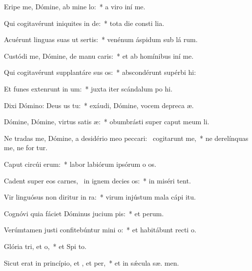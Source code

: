\item Eripe me, Dómine, ab mine lo:~* a viro iní  me.
\item Qui cogitavérunt iniquites in de:~* tota die consti lia.
\item Acuérunt linguas suas ut sertis:~* venénum áspidum sub lá rum.
\item Custódi me, Dómine, de manu caris:~* et ab homínibus iní  me.
\item Qui cogitavérunt supplantáre sus os:~* abscondérunt supérbi  hi:
\item Et funes extenrunt in um:~* juxta iter scándalum po hi.
\item Dixi Dómino: Deus us  tu:~* exáudi, Dómine, vocem depreca æ.
\item Dómine, Dómine, virtus satis æ:~* obumbrásti super caput meum   li.
\item Ne tradas me, Dómine, a desidério meo peccari:~\pscross{} cogitarunt  me,~* ne derelínquas me, ne for tur.
\item Caput circúi erum:~* labor labiórum ipsórum o os.
\item Cadent super eos carnes,~\pscross{} in ignem decies os:~* in miséri  tent.
\item Vir linguósus non diritur in ra:~* virum injústum mala cápi  itu.
\item Cognóvi quia fáciet Dóminus jucium pis:~* et  perum.
\item Verúmtamen justi confitebúntur mini o:~* et habitábunt recti   o.
\item Glória tri, et o,~* et Spi to.
\item Sicut erat in princípio, et , et per,~* et in sǽcula sæ. men.
